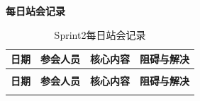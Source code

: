 \begin{levellist}
\begin{itemize}
\begin{itemize}
              \end{itemize}

    \end{itemize}

    \item \textbf{每日站会记录}

    \begin{longtable}{>{\centering\arraybackslash}m{1cm} >{\centering\arraybackslash}m{1cm} >{\centering\arraybackslash}m{9cm} >{\centering\arraybackslash}m{2.5cm}}

        \caption{Sprint2每日站会记录} \label{tab:training}                                                                                                                                                                  \\

        \toprule
        \textbf{日期}                                             & \textbf{参会人员}                                          & \textbf{核心内容}                                                             & \textbf{阻碍与解决} \\
        \midrule
        \endfirsthead

        \multicolumn{4}{c}{{\tablename\ \thetable{} 续表}}                                                                                                                                                              \\
        \toprule
        \textbf{日期}                                             & \textbf{参会人员}                                          & \textbf{核心内容}                                                             & \textbf{阻碍与解决} \\
        \midrule
        \endhead

        \bottomrule
        \endfoot



\end{longtable}
\end{levellist}
